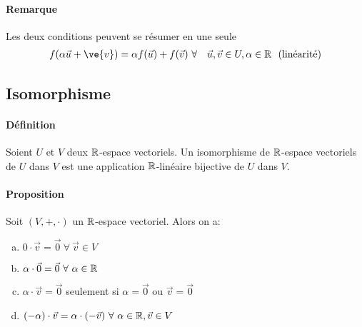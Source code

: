 \paragraph{Remarque} Les deux conditions peuvent se résumer en une seule
  \begin{eqnarray*}
    f(\alpha \vec{u} + \ve{v}) = \alpha f(\vec{u}) + f(\vec{v}) ~ &\forall&\vec{u}, \vec{v} \in U, \alpha \in \R \mbox{~ (linéarité)}
  \end{eqnarray*}

%
\subsection{Isomorphisme}
%
\paragraph{Définition} Soient $U$ et $V$ deux $\mathbb{R}$-espace vectoriels. Un isomorphisme de $\mathbb{R}$-espace vectoriels de $U$ dans $V$ est une application $\mathbb{R}$-linéaire bijective de $U$ dans $V$.

\paragraph{Proposition} Soit $(V, +, \cdot)$ un $\mathbb{R}$-espace vectoriel. Alors on a:
\begin{enumerate}[a)]
  \item $0\cdot \vec{v} = \vec{0} ~\forall~ \vec{v} \in V$
  \item $\alpha \cdot \vec{0} = \vec{0} ~\forall~ \alpha \in \mathbb{R}$
  \item $\alpha \cdot \vec{v} = \vec{0}$ seulement si $\alpha = \vec{0}$ ou $\vec{v} = \vec{0}$
  \item $(-\alpha)\cdot \vec{v} = \alpha \cdot (-\vec{v}) ~\forall~ \alpha \in \mathbb{R}, \vec{v} \in V$
\end{enumerate}

